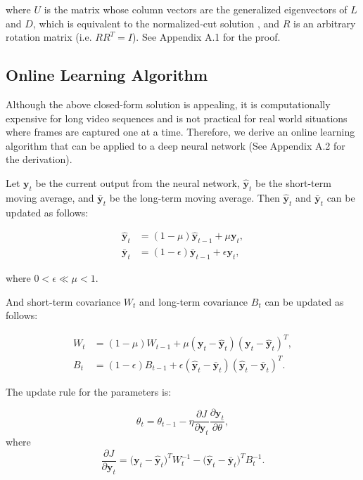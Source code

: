 \documentclass{article}
\begin{document}
where $U$ is the matrix whose column vectors are the generalized eigenvectors of
 $L$ and $D$, which is equivalent to the normalized-cut solution \cite{Shi00}, and $R$ is an arbitrary rotation matrix (i.e. $RR^T = I$). See Appendix A.1 for the proof.


\subsection{Online Learning Algorithm}
Although the above closed-form solution is appealing, it is computationally 
expensive for long video sequences and is not practical for real world 
situations where frames are captured one at a time. Therefore, we derive an 
online learning algorithm that can be applied to a deep neural network (See Appendix A.2 for the derivation).

Let $\mathbf{y}_t$ be the current output from the neural network, $\hat{\mathbf{y}}_t$ be the 
short-term moving average, and $\bar{\mathbf{y}}_t$ be the long-term moving average. 
Then $\hat{\mathbf{y}}_t$ and $\bar{\mathbf{y}}_t$ can be updated as follows:

\begin{align}
\hat{\mathbf{y}}_t &= (1 - \mu)\hat{\mathbf{y}}_{t-1} + \mu \mathbf{y}_t, \\
\bar{\mathbf{y}}_t &= (1 - \epsilon)\bar{\mathbf{y}}_{t-1} + \epsilon \mathbf{y}_t,
\end{align}

where $0 < \epsilon \ll \mu < 1$.

And short-term covariance $W_t$ and long-term covariance $B_t$ can be updated
as follows:

\begin{align}
W_t &= (1 - \mu)W_{t-1} + \mu (\mathbf{y}_t - \hat{\mathbf{y}}_t) (\mathbf{y}_t - \hat{\mathbf{y}}_t)^T, \\
B_t &= (1 - \epsilon)B_{t-1} + \epsilon (\hat{\mathbf{y}}_t - \bar{\mathbf{y}}_t) (\hat{\mathbf{y}}_t - \bar{\mathbf{y}}_t)^T.
\end{align}

The update rule for the parameters is:

\begin{equation}
\theta_t = \theta_{t-1} - \eta \frac{\partial J}{\partial \mathbf{y}_t} \frac{\partial \mathbf{y}_t}{\partial \theta},
\end{equation}
where
 \begin{equation}
\frac{\partial J}{\partial \mathbf{y}_t} = \big(\mathbf{y}_t - \hat{\mathbf{y}}_t\big)^TW_t^{-1} - \big(\hat{\mathbf{y}}_t - \bar{\mathbf{y}}_t\big)^TB_t^{-1}.
\end{equation}
\end{document}
